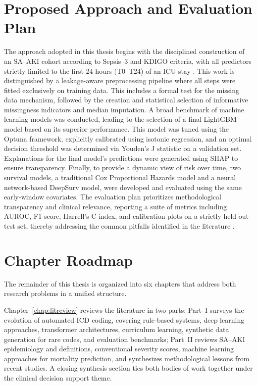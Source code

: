 \section{Proposed Approach and Evaluation Plan} The approach adopted in this thesis begins with the disciplined construction of an SA--AKI cohort according to Sepsis--3 and KDIGO criteria, with all predictors strictly limited to the first 24 hours (T0--T24) of an ICU stay \citep{Singer_2016,KDIGO_2012}. This work is distinguished by a leakage-aware preprocessing pipeline where all steps were fitted exclusively on training data. This includes a formal test for the missing data mechanism, followed by the creation and statistical selection of informative missingness indicators and median imputation. A broad benchmark of machine learning models was conducted, leading to the selection of a final LightGBM model based on its superior performance. This model was tuned using the Optuna framework, explicitly calibrated using isotonic regression, and an optimal decision threshold was determined via Youden's J statistic on a validation set. Explanations for the final model's predictions were generated using SHAP to ensure transparency. Finally, to provide a dynamic view of risk over time, two survival models, a traditional Cox Proportional Hazards model and a neural network-based DeepSurv model, were developed and evaluated using the same early-window covariates. The evaluation plan prioritizes methodological transparency and clinical relevance, reporting a suite of metrics including AUROC, F1-score, Harrell's C-index, and calibration plots on a strictly held-out test set, thereby addressing the common pitfalls identified in the literature \citep{Kang_Yoon_2023,Chen_2025}.

\section{Chapter Roadmap} The remainder of this thesis is organized into six chapters that address both research problems in a unified structure.

Chapter~\ref{chap:litreview} reviews the literature in two parts: Part~I surveys the evolution of automated ICD coding, covering rule-based systems, deep learning approaches, transformer architectures, curriculum learning, synthetic data generation for rare codes, and evaluation benchmarks; Part~II reviews SA--AKI epidemiology and definitions, conventional severity scores, machine learning approaches for mortality prediction, and synthesizes methodological lessons from recent studies. A closing synthesis section ties both bodies of work together under the clinical decision support theme.

